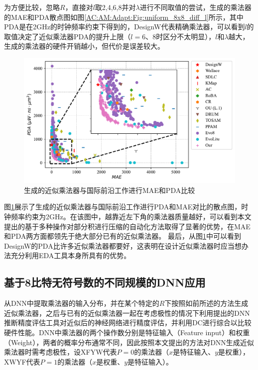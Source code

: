 为方便比较，忽略$R$，直接对$l$取2,4,6,8并对$\lambda$进行不同取值的尝试，生成的乘法器的MAE和PDA散点图如图\ref{AC:AM:Adapt:Fig:uniform_8x8_diff_l}所示，其中PDA是在2GHz的时钟频率约束下得到的，DesignW代表精确乘法器，可以看到$l$的取值决定了近似乘法器PDA的提升上限（$l=6$、8时区分不太明显），$l$和$\lambda$越大，生成的乘法器的硬件开销越小，但代价是误差较大。

\begin{figure}[!h]
    \centering
    \includegraphics[width=\linewidth]{figs/AC-AM-Adapt-uniform_8x8_PDA_MAE.pdf}
    \caption{生成的近似乘法器与国际前沿工作进行MAE和PDA比较}
    \label{AC:AM:Adapt:Fig:uniform_8x8_PDA_MAE}
\end{figure}
图\ref{AC:AM:Adapt:Fig:uniform_8x8_PDA_MAE}展示了生成的近似乘法器与国际前沿工作进行PDA和MAE对比的散点图，时钟频率约束为2GHz。在该图中，越靠近左下角的乘法器质量越好，可以看到本文提出的基于多种操作对部分积进行压缩的自动化方法取得了显著的优势，在MAE和PDA两方面都领先于绝大部分已有的近似乘法器。
最后，从图\ref{AC:AM:Adapt:Fig:uniform_8x8_PDA_MAE}中可以看到DesignW的PDA比许多近似乘法器都要好，这表明在设计近似乘法器时应当想办法充分利用EDA工具本身所具有的优势。


\subsection{基于8比特无符号数的不同规模的DNN应用}

从DNN中提取乘法器的输入分布，并在某个特定的$R$下按照如前所述的方法生成近似乘法器，之后与已有的近似乘法器一起在考虑极性的情况下利用提出的DNN推断精度评估工具对近似后的神经网络进行精度评估，并利用DC进行综合以比较硬件性能。DNN中乘法器的两个操作数分别是特征输入（Feature input）和权重（Weight），两者的概率分布通常不同，因此按照本文提出的方法对DNN生成近似乘法器时需考虑极性，设XFYW代表$P=0$的乘法器（$x$是特征输入、$y$是权重），XWYF代表$P=1$的乘法器（$x$是权重、$y$是特征输入）。

